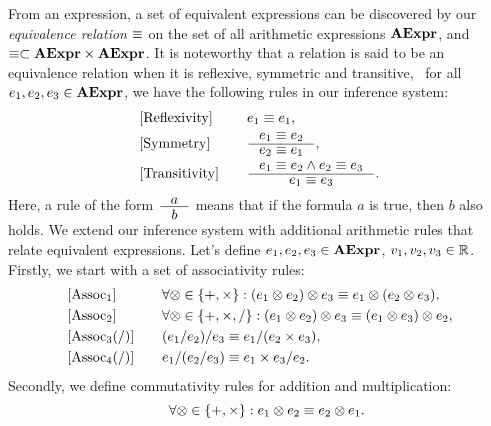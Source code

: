 From an expression, a set of equivalent expressions can be discovered by our
\emph{equivalence relation} $\equiv$ on the set of all arithmetic expressions
$\mathbf{AExpr}$, and $\equiv \subset \mathbf{AExpr}\times\mathbf{AExpr}$.  It is noteworthy
that a relation is said to be an equivalence relation when it is reflexive,
symmetric and transitive, \ie~for all $e_1, e_2, e_3 \in \mathbf{AExpr}$, we
have the following rules in our inference system:
\begin{equation}
    \begin{aligned}{}
        & [\mathrm{Reflexivity}] & \quad &
            e_1 \eqrel e_1, \\
        & [\mathrm{Symmetry}] & \quad &
            \inference{e_1 \eqrel e_2}{e_2 \eqrel e_1}, \\
        & [\mathrm{Transitivity}] & \quad &
            \inference{e_1 \eqrel e_2 \wedge e_2 \eqrel e_3}{e_1 \eqrel e_3}.
    \end{aligned}
    \label{so:eq:equivalence_relation}
\end{equation}
Here, a rule of the form $\inference{a}{b}$ means that if the formula $a$ is
true, then $b$ also holds.  We extend our inference system with additional
arithmetic rules that relate equivalent expressions.  Let's define $e_1, e_2,
e_3 \in \mathbf{AExpr}$, $v_1, v_2, v_3 \in \mathbb{R}$.  Firstly, we start with a set
of associativity rules:
\begin{equation}
    \begin{aligned}{}
        & [\mathrm{Assoc}_1] & \quad &
            \forall \otimes \in \{ +, \times \}:
            (e_1 \otimes e_2) \otimes e_3
            \equiv e_1 \otimes (e_2 \otimes e_3), \\
        & [\mathrm{Assoc}_2] & \quad &
            \forall \otimes \in \{ +, \times, / \}:
            (e_1 \otimes e_2) \otimes e_3
            \equiv (e_1 \otimes e_3) \otimes e_2, \\
        & [\mathrm{Assoc}_3 (/)] & \quad &
            (e_1 / e_2) / e_3 \equiv e_1 / (e_2 \times e_3), \\
        & [\mathrm{Assoc}_4 (/)] & \quad &
            e_1 / (e_2 / e_3) \equiv e_1 \times e_3 / e_2.
    \end{aligned}
\end{equation}
Secondly, we define commutativity rules for addition and multiplication:
\begin{equation}
    [\mathrm{Commut}] \quad
    \forall \opsymbol \in \{ +, \times \}:
        e_1 \opsymbol e_2 \eqrel e_2 \opsymbol e_1.
\end{equation}
